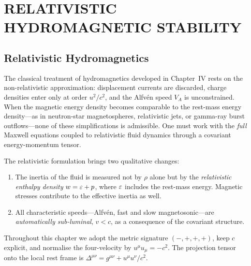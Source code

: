 
\chapter{RELATIVISTIC HYDROMAGNETIC STABILITY}
\label{ch:rel4}
\setcounter{section}{35}

\section{Relativistic Hydromagnetics}\label{sec:rel36}

The classical treatment of hydromagnetics developed in Chapter~IV rests on
the non-relativistic approximation: displacement currents are discarded,
charge densities enter only at order $u^{2}/c^{2}$, and the Alfv\'en speed
$V_{A}$ is unconstrained.  When the magnetic energy density becomes
comparable to the rest-mass energy density---as in neutron-star
magnetospheres, relativistic jets, or gamma-ray burst outflows---none of
these simplifications is admissible.  One must work with the \emph{full}
Maxwell equations coupled to relativistic fluid dynamics through a covariant
energy-momentum tensor.

The relativistic formulation brings two qualitative changes:
\begin{enumerate}
\item The inertia of the fluid is measured not by $\rho$ alone but by the
      \emph{relativistic enthalpy density} $w = \varepsilon + p$,
      where $\varepsilon$ includes the rest-mass energy.  Magnetic stresses
      contribute to the effective inertia as well.
\item All characteristic speeds---Alfv\'en, fast and slow
      magnetosonic---are \emph{automatically sub-luminal},
      $v < c$, as a consequence of the covariant structure.
\end{enumerate}

Throughout this chapter we adopt the metric signature $(-,+,+,+)$, keep
$c$ explicit, and normalise the four-velocity by $u^{\mu}u_{\mu} = -c^{2}$.
The projection tensor onto the local rest frame is
$\Delta^{\mu\nu} = g^{\mu\nu} + u^{\mu}u^{\nu}/c^{2}$.


